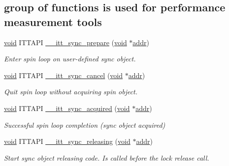 \subsection*{group of functions is used for performance measurement tools}
\begin{DoxyCompactItemize}
\item 
\hyperlink{ittnotify__static_8h_af941d56e55e3c5465135b60c4d6343ed}{void} I\-T\-T\-A\-P\-I \hyperlink{group__sync_ga27637e91541f997e5e9369a04f094721}{\-\_\-\-\_\-itt\-\_\-sync\-\_\-prepare} (\hyperlink{ittnotify__static_8h_af941d56e55e3c5465135b60c4d6343ed}{void} $\ast$\hyperlink{ittnotify__static_8h_a7e21c61c16fffcc27199a9d66ff39ab8}{addr})
\begin{DoxyCompactList}\small\item\em Enter spin loop on user-\/defined sync object. \end{DoxyCompactList}\item 
\hyperlink{ittnotify__static_8h_af941d56e55e3c5465135b60c4d6343ed}{void} I\-T\-T\-A\-P\-I \hyperlink{group__sync_gadf4d915083aa5ab2193ef5d1b0987e01}{\-\_\-\-\_\-itt\-\_\-sync\-\_\-cancel} (\hyperlink{ittnotify__static_8h_af941d56e55e3c5465135b60c4d6343ed}{void} $\ast$\hyperlink{ittnotify__static_8h_a7e21c61c16fffcc27199a9d66ff39ab8}{addr})
\begin{DoxyCompactList}\small\item\em Quit spin loop without acquiring spin object. \end{DoxyCompactList}\item 
\hyperlink{ittnotify__static_8h_af941d56e55e3c5465135b60c4d6343ed}{void} I\-T\-T\-A\-P\-I \hyperlink{group__sync_ga3a08077b82c93d544473e6155a1e66c6}{\-\_\-\-\_\-itt\-\_\-sync\-\_\-acquired} (\hyperlink{ittnotify__static_8h_af941d56e55e3c5465135b60c4d6343ed}{void} $\ast$\hyperlink{ittnotify__static_8h_a7e21c61c16fffcc27199a9d66ff39ab8}{addr})
\begin{DoxyCompactList}\small\item\em Successful spin loop completion (sync object acquired) \end{DoxyCompactList}\item 
\hyperlink{ittnotify__static_8h_af941d56e55e3c5465135b60c4d6343ed}{void} I\-T\-T\-A\-P\-I \hyperlink{group__sync_gadde263abd14a8ff4b88edf8afd86f7a2}{\-\_\-\-\_\-itt\-\_\-sync\-\_\-releasing} (\hyperlink{ittnotify__static_8h_af941d56e55e3c5465135b60c4d6343ed}{void} $\ast$\hyperlink{ittnotify__static_8h_a7e21c61c16fffcc27199a9d66ff39ab8}{addr})
\begin{DoxyCompactList}\small\item\em Start sync object releasing code. Is called before the lock release call. \end{DoxyCompactList}\end{DoxyCompactItemize}


